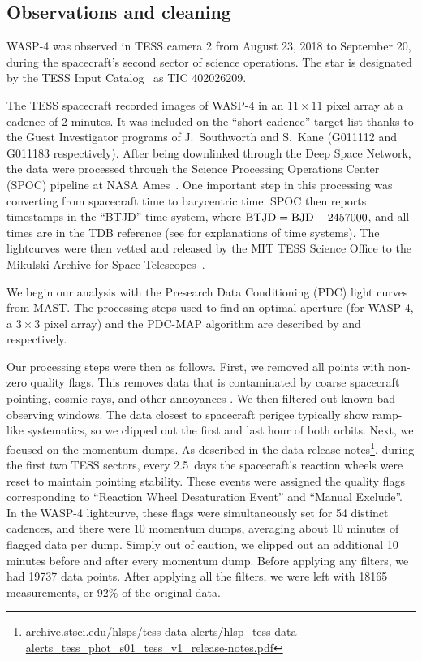 \documentclass[12pt,twocolumn,tighten]{aastex62}
\begin{document}
\subsection{Observations and cleaning}
WASP-4 was observed in TESS camera 2 from August 23, 2018 to September
20, during the spacecraft's second sector of science operations.  The
star is designated by the TESS Input
Catalog~\citep[TIC;][]{stassun_TIC_2018} as TIC 402026209.

The TESS spacecraft recorded images of WASP-4 in an $11\times11$ pixel
array at a cadence of 2 minutes.  It was included on the
``short-cadence'' target list thanks to the Guest Investigator
programs of J.\ Southworth and S.\ Kane (G011112 and G011183
respectively).  After being downlinked through the Deep Space Network,
the data were processed through the Science Processing Operations
Center (SPOC) pipeline at NASA Ames~\citep{jenkins_tess_2016}.  One
important step in this processing was converting from spacecraft time
to barycentric time.  SPOC then reports timestamps in the ``BTJD''
time system, where ${\rm BTJD} = {\rm BJD} - 2457000$, and all times
are in the TDB reference (see \citealt{urban_explanatory_2012} for
explanations of time systems).  The lightcurves were then vetted and
released by the MIT TESS Science Office to the Mikulski Archive for
Space Telescopes~\citep{ricker_tess_alerts_2018}.

We begin our analysis with the Presearch Data Conditioning (PDC) light
curves from MAST.  The processing steps used to find an optimal
aperture (for WASP-4, a $3\times 3$ pixel array) and the PDC-MAP
algorithm are described by \citet{smith_kepler_apertures_2017} and
\citet{smith_kepler_PDC_2017} respectively.

Our processing steps were then as follows.  First, we removed all
points with non-zero quality flags.  This removes data that is
contaminated by coarse spacecraft pointing, cosmic rays, and other
annoyances \citep{tess_data_product_description_2018}.  We then
filtered out known bad observing windows.  The data closest to
spacecraft perigee typically show ramp-like systematics, so we clipped
out the first and last hour of both orbits.  Next, we focused on the
momentum dumps. As described in the data release
notes\footnote{\url{archive.stsci.edu/hlsps/tess-data-alerts/hlsp_tess-data-alerts_tess_phot_s01_tess_v1_release-notes.pdf}},
during the first two TESS sectors, every 2.5~days the spacecraft's
reaction wheels were reset to maintain pointing stability.  These
events were assigned the quality flags corresponding to ``Reaction
Wheel Desaturation Event'' and ``Manual Exclude''.  In the WASP-4
lightcurve, these flags were simultaneously set for 54 distinct
cadences, and there were 10 momentum dumps, averaging about 10 minutes
of flagged data per dump.  Simply out of caution, we clipped out an
additional 10 minutes before and after every momentum dump.  Before
applying any filters, we had 19737 data points. After applying all the
filters, we were left with 18165 measurements, or 92\% of the original
data.
\end{document}
